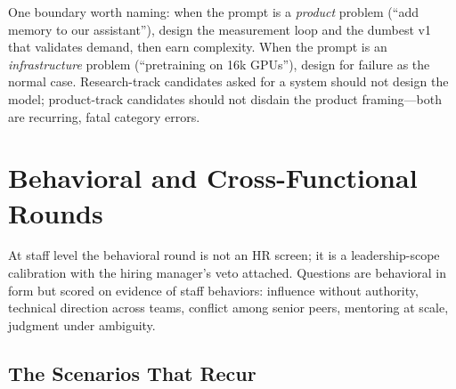 One boundary worth naming: when the prompt is a \textit{product} problem (``add memory to our assistant''), design the measurement loop and the dumbest v1 that validates demand, then earn complexity. When the prompt is an \textit{infrastructure} problem (``pretraining on 16k GPUs''), design for failure as the normal case. Research-track candidates asked for a system should not design the model; product-track candidates should not disdain the product framing---both are recurring, fatal category errors.

\section{Behavioral and Cross-Functional Rounds}
\label{sec:behavioral_rounds}

At staff level the behavioral round is not an HR screen; it is a leadership-scope calibration with the hiring manager's veto attached. Questions are behavioral in form but scored on evidence of staff behaviors: influence without authority, technical direction across teams, conflict among senior peers, mentoring at scale, judgment under ambiguity.

\subsection{The Scenarios That Recur}

